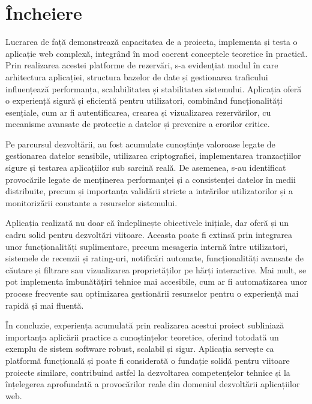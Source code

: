 \documentclass[12pt, a4paper, oneside, romanian]{teza-upb}
\begin{document}
\chapter{Încheiere}
Lucrarea de față demonstrează capacitatea de a proiecta, implementa și testa o aplicație web complexă, integrând în mod coerent conceptele teoretice în practică. Prin realizarea acestei platforme de rezervări, s-a evidențiat modul în care arhitectura aplicației, structura bazelor de date și gestionarea traficului influențează performanța, scalabilitatea și stabilitatea sistemului. Aplicația oferă o experiență sigură și eficientă pentru utilizatori, combinând funcționalități esențiale, cum ar fi autentificarea, crearea și vizualizarea rezervărilor, cu mecanisme avansate de protecție a datelor și prevenire a erorilor critice.

Pe parcursul dezvoltării, au fost acumulate cunoștințe valoroase legate de gestionarea datelor sensibile, utilizarea criptografiei, implementarea tranzacțiilor sigure și testarea aplicațiilor sub sarcină reală. De asemenea, s-au identificat provocările legate de menținerea performanței și a consistenței datelor în medii distribuite, precum și importanța validării stricte a intrărilor utilizatorilor și a monitorizării constante a resurselor sistemului.

Aplicația realizată nu doar că îndeplinește obiectivele inițiale, dar oferă și un cadru solid pentru dezvoltări viitoare. Aceasta poate fi extinsă prin integrarea unor funcționalități suplimentare, precum mesageria internă între utilizatori, sistemele de recenzii și rating-uri, notificări automate, funcționalități avansate de căutare și filtrare sau vizualizarea proprietăților pe hărți interactive. Mai mult, se pot implementa îmbunătățiri tehnice mai accesibile, cum ar fi automatizarea unor procese frecvente sau optimizarea gestionării resurselor pentru o experiență mai rapidă și mai fluentă.

În concluzie, experiența acumulată prin realizarea acestui proiect subliniază importanța aplicării practice a cunoștințelor teoretice, oferind totodată un exemplu de sistem software robust, scalabil și sigur. Aplicația servește ca platformă funcțională și poate fi considerată o fundație solidă pentru viitoare proiecte similare, contribuind astfel la dezvoltarea competențelor tehnice și la înțelegerea aprofundată a provocărilor reale din domeniul dezvoltării aplicațiilor web.




\end{document}
